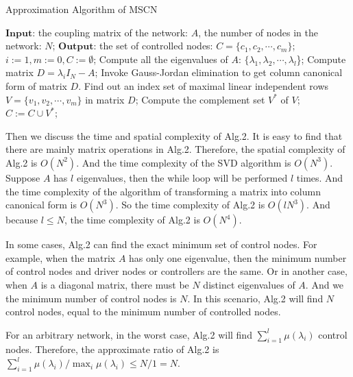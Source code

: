 \documentclass[10pt, conference, letterpaper]{IEEEtran}
\begin{document}
\begin{algorithm}
\caption{Approximation Algorithm of MSCN}
\label{alg2}
\begin{algorithmic}[1]
\STATE $\textbf{Input:}$ the coupling matrix of the network: $A$, the number of nodes in the network: $N$;
\STATE $\textbf{Output:}$ the set of controlled nodes: $C = \{c_1,c_2,\cdots,c_m\}$;
\STATE $i :=1, m :=0, C :=\emptyset$;
\STATE Compute all the eigenvalues of $A$: $\{\lambda_1,\lambda_2,\cdots,\lambda_l$\};
    \STATE  Compute matrix $D = \lambda_iI_N - A$;
    \STATE  Invoke Gauss-Jordan elimination to get column canonical form of matrix $D$.
    \STATE  Find out an index set of maximal linear independent rows $V = \{v_1,v_2,\cdots,v_m\}$ in matrix $D$;
    \STATE  Compute the complement set $V^*$ of $V$;
    \STATE  $C :=C \cup V^*$;
\ENDWHILE

\end{algorithmic}
\end{algorithm}

Then we discuss the time and spatial complexity of Alg.2. It is easy to find that there are mainly matrix operations in Alg.2. Therefore, the spatial complexity of Alg.2 is $O(N^2)$. And the time complexity of the SVD algorithm is $O(N^3)$. Suppose $A$ has $l$ eigenvalues, then the while loop will be performed $l$ times. And the time complexity of the algorithm of transforming a matrix into column canonical form is $O(N^3)$. So the time complexity of Alg.2 is $O(lN^3)$. And because $l \le N$, the time complexity of Alg.2 is $O(N^4)$.

In some cases, Alg.2 can find the exact minimum set of control nodes. For example, when the matrix $A$ has only one eigenvalue, then the minimum number of control nodes and driver nodes or controllers are the same. Or in another case, when $A$ is a diagonal matrix, there must be $N$ distinct eigenvalues of $A$. And we the minimum number of control nodes is $N$. In this scenario, Alg.2 will find $N$ control nodes, equal to the minimum number of controlled nodes.

For an arbitrary network, in the worst case, Alg.2 will find $\sum\limits_{i=1}^l \mu(\lambda_i)$ control nodes. Therefore, the approximate ratio of Alg.2 is $\sum\limits_{i=1}^l \mu(\lambda_i) / \max_i {\mu(\lambda_i)} \le N/1 = N$.
\end{document}
